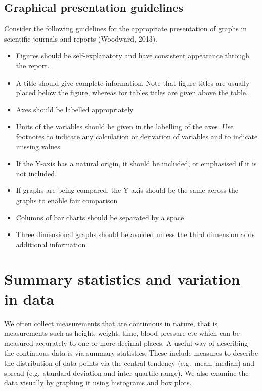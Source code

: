 \documentclass[
]{memoir}
\providecommand{\tightlist}{%
  \setlength{\itemsep}{0pt}\setlength{\parskip}{0pt}}
\begin{document}
\hypertarget{graphical-presentation-guidelines}{%
\subsection{Graphical presentation guidelines}\label{graphical-presentation-guidelines}}

Consider the following guidelines for the appropriate presentation of graphs in scientific journals and reports (Woodward, 2013).

\begin{itemize}
\tightlist
\item
  Figures should be self-explanatory and have consistent appearance through the report.
\item
  A title should give complete information. Note that figure titles are usually placed below the figure, whereas for tables titles are given above the table.
\item
  Axes should be labelled appropriately
\item
  Units of the variables should be given in the labelling of the axes. Use footnotes to indicate any calculation or derivation of variables and to indicate missing values
\item
  If the Y-axis has a natural origin, it should be included, or emphasised if it is not included.
\item
  If graphs are being compared, the Y-axis should be the same across the graphs to enable fair comparison
\item
  Columns of bar charts should be separated by a space
\item
  Three dimensional graphs should be avoided unless the third dimension adds additional information
\end{itemize}

\hypertarget{summary-statistics-and-variation-in-data}{%
\section{Summary statistics and variation in data}\label{summary-statistics-and-variation-in-data}}

We often collect measurements that are continuous in nature, that is measurements such as height, weight, time, blood pressure etc which can be measured accurately to one or more decimal places. A useful way of describing the continuous data is via summary statistics. These include measures to describe the distribution of data points via the central tendency (e.g.~mean, median) and spread (e.g.~standard deviation and inter quartile range). We also examine the data visually by graphing it using histograms and box plots.
\end{document}

